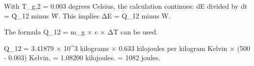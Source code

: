 With T_g,2 = 0.003 degrees Celsius, the calculation continues:  
dE divided by dt = Q̇_12 minus Ẇ.  
This implies ΔE = Q_12 minus W.  

The formula Q_12 = m_g × c × ΔT can be used.  

Q_12 = 3.41879 × 10^3 kilograms × 0.633 kilojoules per kilogram Kelvin × (500 - 0.003) Kelvin.  
= 1.08200 kilojoules.  
= 1082 joules.